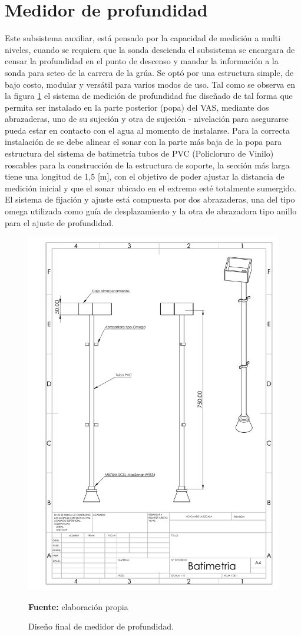 \section{Medidor de profundidad}
Este subsistema auxiliar, está pensado por la capacidad de medici\'on a multi niveles, cuando se requiera que la sonda descienda el subsistema se encargara de censar la profundidad en el punto de descenso y mandar la informaci\'on a la sonda para seteo de la carrera de la gr\'ua. Se opt\'o por una estructura simple, de bajo costo,  modular y vers\'atil para varios modos de uso.  
Tal como se observa en la figura \ref{fig:batimetro} el sistema de medici\'on de profundidad fue dise\~nado de tal forma que permita ser instalado en la parte posterior (popa) del VAS, mediante dos abrazaderas, uno de su sujeci\'on y otra de sujeci\'on - nivelaci\'on para asegurarse  pueda estar en contacto con el agua al momento de instalarse.  Para la correcta  instalaci\'on de se debe alinear el sonar con la parte m\'as baja de la popa para estructura del sistema de batimetr\'ia tubos de PVC (Policloruro de Vinilo) roscables para la construcci\'on de la estructura de soporte, la secci\'on m\'as larga tiene una longitud de 1,5 [m], con el objetivo de poder ajustar la distancia de medici\'on inicial y que el sonar ubicado en el extremo est\'e totalmente sumergido. El sistema de fijaci\'on y ajuste est\'a compuesta por dos abrazaderas, una del tipo omega utilizada como gu\'ia de desplazamiento y la otra de abrazadora tipo anillo para el ajuste de profundidad. 
\begin{figure}[H]
\centering
\includegraphics[width=0.9\linewidth]{Imagenes/cap3/Batimetria.pdf}
\caption{Dise\~no final de medidor de profundidad. }{\textbf{Fuente:} elaboración propia}
\label{fig:batimetro}
\end{figure}
